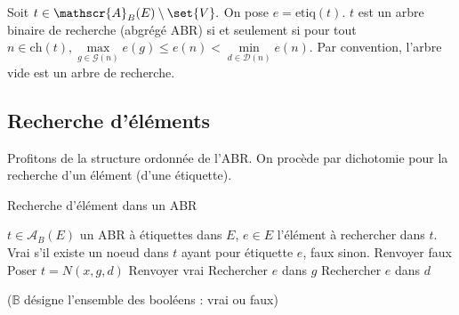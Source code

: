 \documentclass{scrartcl}
\begin{document}
		Soit $t \in \mathscr{A}_B(E) \setminus \set{V}.$ On pose $e = \mathrm{etiq}(t)$.
		$t$ est un arbre binaire de recherche (abgrégé ABR) si et seulement si pour tout $n \in \mathrm{ch}(t), \max\limits_{g \in \mathscr{G}(n)} e(g) \leq e(n) < \min\limits_{d \in \mathscr{D}(n)} e(n)$. Par convention, l'arbre vide est un arbre de recherche.

		\subsection{Recherche d'éléments}
			Profitons de la structure ordonnée de l'ABR. On procède par dichotomie pour la recherche d'un élément (d'une étiquette).
			
			\begin{algorithm}[H]
				\caption{Recherche d'élément dans un ABR}
				\Entree
				{
					$t \in \mathscr{A}_B(E)$ un ABR à étiquettes dans $E$,
					$e \in E$ l'élément à rechercher dans $t$.
				}
				\Sortie
				{
					Vrai s'il existe un noeud dans $t$ ayant pour étiquette $e$, faux sinon.
				}
				{
					Renvoyer faux
				}
				{
					Poser $t = N(x,g,d)$ \;
					{
						Renvoyer vrai
					}
					{
						{
							Rechercher $e$ dans $g$
						}
						{
							Rechercher $e$ dans $d$
						}
					}
				}
			\end{algorithm}
			($\mathbb{B}$ désigne l'ensemble des booléens : vrai ou faux)
\end{document}
